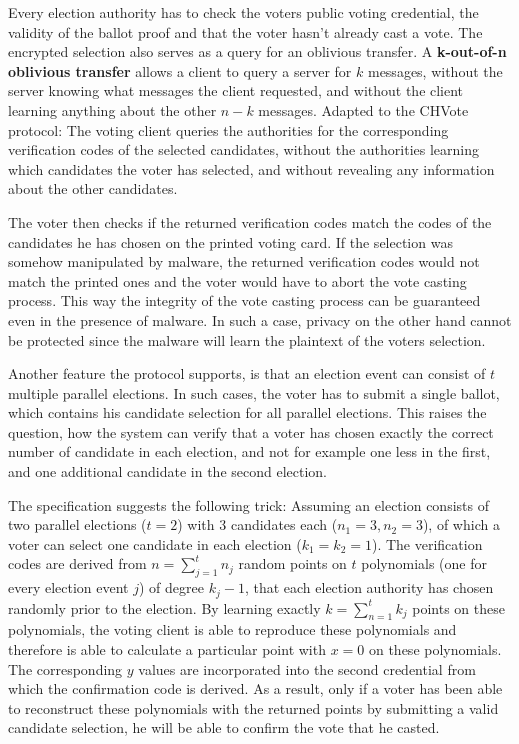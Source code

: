 Every election authority has to check the voters public voting credential, the validity of the ballot proof and that the voter hasn't already cast a vote. The encrypted selection also serves as a query for an oblivious transfer. A \textbf{k-out-of-n oblivious transfer} allows a client to query a server for $k$ messages, without the server knowing what messages the client requested, and without the client learning anything about the other $n-k$ messages. Adapted to the CHVote protocol: The voting client queries the authorities for the corresponding verification codes of the selected candidates, without the authorities learning which candidates the voter has selected, and without revealing any information about the other candidates. 

The voter then checks if the returned verification codes match the codes of the candidates he has chosen on the printed voting card. If the selection was somehow manipulated by malware, the returned verification codes would not match the printed ones and the voter would have to abort the vote casting process. This way the integrity of the vote casting process can be guaranteed even in the presence of malware. In such a case, privacy on the other hand cannot be protected since the malware will learn the plaintext of the voters selection.

Another feature the protocol supports, is that an election event can consist of $t$ multiple parallel elections. In such cases, the voter has to submit a single ballot, which contains his candidate selection for all parallel elections. This raises the question, how the system can verify that a voter has chosen exactly the correct number of candidate in each election, and not for example one less in the first, and one additional candidate in the second election.

The specification suggests the following trick: Assuming an election consists of two parallel elections ($t=2$) with 3 candidates each ($n_1 = 3, n_2 = 3$), of which a voter can select one candidate in each election ($k_1 = k_2 =1$). The verification codes are derived from $n = \sum_{j=1}^{t} n_j$ random points on $t$ polynomials (one for every election event $j$) of degree $k_j - 1$, that each election authority has chosen randomly prior to the election. By learning exactly $k = \sum_{n=1}^{t} k_j$ points on these polynomials, the voting client is able to reproduce these polynomials and therefore is able to calculate a particular point with $x=0$ on these polynomials. The corresponding $y$ values are incorporated into the second credential from which the confirmation code is derived. As a result, only if a voter has been able to reconstruct these polynomials with the returned points by submitting a valid candidate selection, he will be able to confirm the vote that he casted.

